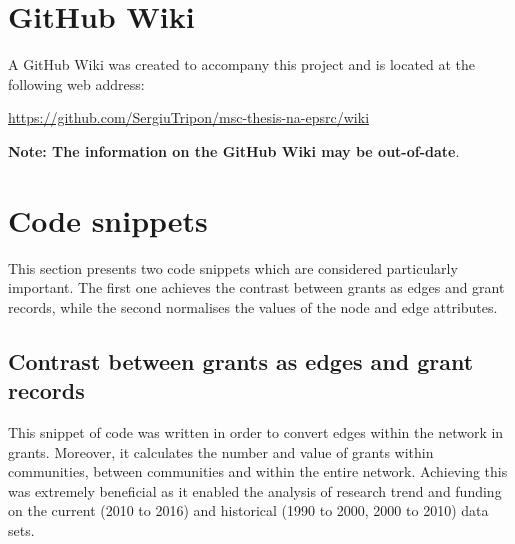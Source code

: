 \section{GitHub Wiki}

A GitHub Wiki was created to accompany this project and is located at the following web address: 

\url{https://github.com/SergiuTripon/msc-thesis-na-epsrc/wiki}

\noindent \textbf{Note: The information on the GitHub Wiki may be out-of-date}.

\section{Code snippets}

This section presents two code snippets which are considered particularly important. The first one achieves the contrast between grants as edges and grant records, while the second normalises the values of the node and edge attributes.

\clearpage

\subsection{Contrast between grants as edges and grant records}

This snippet of code was written in order to convert edges within the network in grants. Moreover, it calculates the number and value of grants within communities, between communities and within the entire network. Achieving this was extremely beneficial as it enabled the analysis of research trend and funding on the current (2010 to 2016) and historical (1990 to 2000, 2000 to 2010) data sets.

